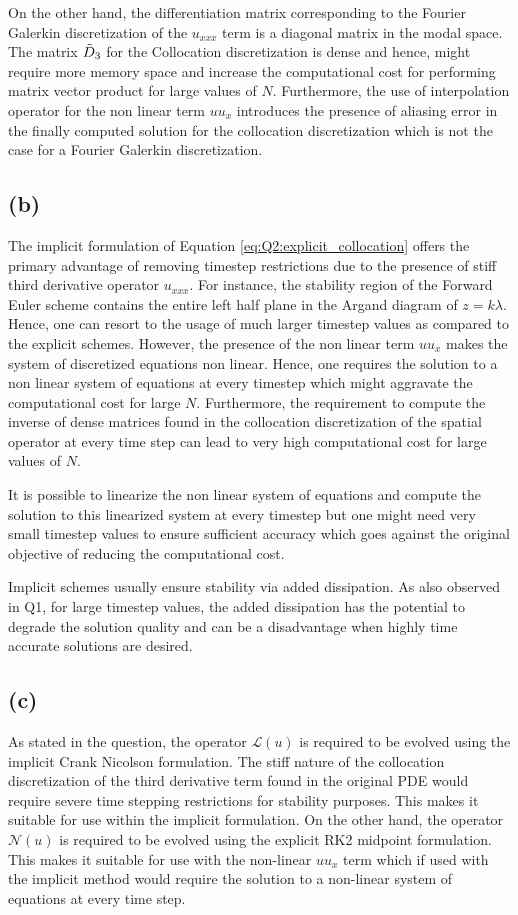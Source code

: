 \documentclass[12pt]{article}
\begin{document}
On the other hand, the differentiation matrix corresponding to the Fourier Galerkin discretization of the $u_{xxx}$ term is a diagonal matrix in the modal space. The matrix $\Tilde{D}_3$ for the Collocation discretization is dense and hence, might require more memory space and increase the computational cost for performing matrix vector product for large values of $N$. Furthermore, the use of interpolation operator for the non linear term $uu_x$ introduces the presence of aliasing error in the finally computed solution for the collocation discretization which is not the case for a Fourier Galerkin discretization.

\subsection{(b)}
The implicit formulation of Equation \ref{eq:Q2:explicit_collocation} offers the primary advantage of removing timestep restrictions due to the presence of stiff third derivative operator $u_{xxx}$. For instance, the stability region of the Forward Euler scheme contains the entire left half plane in the Argand diagram of $z = k \lambda$. Hence, one can resort to the usage of much larger timestep values as compared to the explicit schemes. However, the presence of the non linear term $uu_x$ makes the system of discretized equations non linear. Hence, one requires the solution to a non linear system of equations at every timestep which might aggravate the computational cost for large $N$. Furthermore, the requirement to compute the inverse of dense matrices found in the collocation discretization of the spatial operator at every time step can lead to very high computational cost for large values of $N$. 

It is possible to linearize the non linear system of equations and compute the solution to this linearized system at every timestep but one might need very small timestep values to ensure sufficient accuracy which goes against the original objective of reducing the computational cost. 

Implicit schemes usually ensure stability via added dissipation. As also observed in Q1, for large timestep values, the added dissipation has the potential to degrade the solution quality and can be a disadvantage when highly time accurate solutions are desired. 
\subsection{(c)}
As stated in the question, the operator $\mathcal{L}(u)$ is required to be evolved using the implicit Crank Nicolson formulation. The stiff nature of the collocation discretization of the third derivative term found in the original PDE would require severe time stepping restrictions for stability purposes. This makes it suitable for use within the implicit formulation. On the other hand, the operator $\mathcal{N}(u)$ is required to be evolved using the explicit RK2 midpoint formulation. This makes it suitable for use with the non-linear $uu_x$ term which if used with the implicit method would require the solution to a non-linear system of equations at every time step. 
\end{document}
